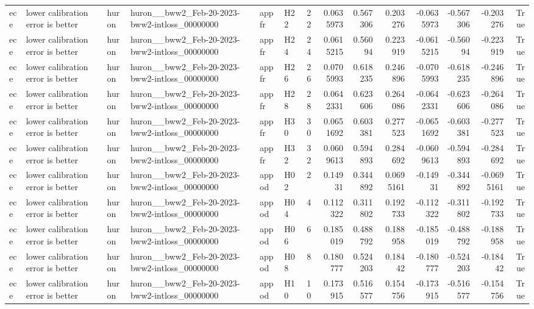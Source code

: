 \begin{longtable}{llllllrrrrrrrr}
ece & lower calibration error is better & huron & huron\_\_bww2\_Feb-20-2023-bww2-intloss\_00000000 & appfr & H22 & 22 & 0.0635973 & 0.567306 & 0.203276 & -0.0635973 & -0.567306 & -0.203276 & True \\
ece & lower calibration error is better & huron & huron\_\_bww2\_Feb-20-2023-bww2-intloss\_00000000 & appfr & H24 & 24 & 0.0615215 & 0.56094 & 0.223919 & -0.0615215 & -0.56094 & -0.223919 & True \\
ece & lower calibration error is better & huron & huron\_\_bww2\_Feb-20-2023-bww2-intloss\_00000000 & appfr & H26 & 26 & 0.0705993 & 0.618235 & 0.246896 & -0.0705993 & -0.618235 & -0.246896 & True \\
ece & lower calibration error is better & huron & huron\_\_bww2\_Feb-20-2023-bww2-intloss\_00000000 & appfr & H28 & 28 & 0.0642331 & 0.623606 & 0.264086 & -0.0642331 & -0.623606 & -0.264086 & True \\
ece & lower calibration error is better & huron & huron\_\_bww2\_Feb-20-2023-bww2-intloss\_00000000 & appfr & H30 & 30 & 0.0651692 & 0.603381 & 0.277523 & -0.0651692 & -0.603381 & -0.277523 & True \\
ece & lower calibration error is better & huron & huron\_\_bww2\_Feb-20-2023-bww2-intloss\_00000000 & appfr & H32 & 32 & 0.0609613 & 0.594893 & 0.284692 & -0.0609613 & -0.594893 & -0.284692 & True \\
ece & lower calibration error is better & huron & huron\_\_bww2\_Feb-20-2023-bww2-intloss\_00000000 & appod & H02 & 2 & 0.14931 & 0.344892 & 0.0695161 & -0.14931 & -0.344892 & -0.0695161 & True \\
ece & lower calibration error is better & huron & huron\_\_bww2\_Feb-20-2023-bww2-intloss\_00000000 & appod & H04 & 4 & 0.112322 & 0.311802 & 0.192733 & -0.112322 & -0.311802 & -0.192733 & True \\
ece & lower calibration error is better & huron & huron\_\_bww2\_Feb-20-2023-bww2-intloss\_00000000 & appod & H06 & 6 & 0.185019 & 0.488792 & 0.188958 & -0.185019 & -0.488792 & -0.188958 & True \\
ece & lower calibration error is better & huron & huron\_\_bww2\_Feb-20-2023-bww2-intloss\_00000000 & appod & H08 & 8 & 0.180777 & 0.524203 & 0.18442 & -0.180777 & -0.524203 & -0.18442 & True \\
ece & lower calibration error is better & huron & huron\_\_bww2\_Feb-20-2023-bww2-intloss\_00000000 & appod & H10 & 10 & 0.173915 & 0.516577 & 0.154756 & -0.173915 & -0.516577 & -0.154756 & True \\

\end{longtable}
